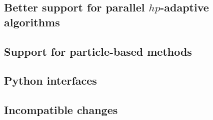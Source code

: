 \documentclass{ansarticle-preprint}
\begin{document}
\subsection{Better support for parallel $hp$-adaptive algorithms}
\label{subsec:hp}



\subsection{Support for particle-based methods}
\label{subsec:particles}



\subsection{Python interfaces}
\label{subsec:python}





\subsection{Incompatible changes}
\end{document}
